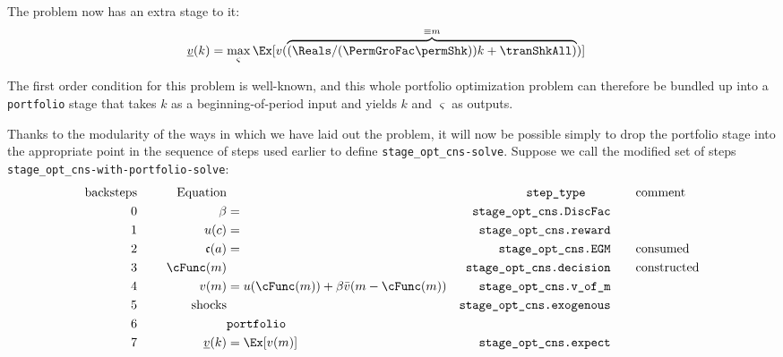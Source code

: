 \documentclass[\econtexRoot/BufferStockTheory]{subfiles}
\newcommand{\EOP}{\bar}
\newcommand{\MOP}{}
\newcommand{\BOP}{\underline}
\begin{document}
The problem now has an extra stage to it:
\begin{align*}
  \BOP{v}(k) & = \max_{\varsigma} \Ex[\MOP{v}(\overbrace{(\Reals/(\PermGroFac \permShk))k+\tranShkAll)}^{\equiv m})]
\end{align*}

The first order condition for this problem is well-known, and this whole portfolio optimization problem can therefore be bundled up into a \texttt{portfolio} stage that takes $k$ as a beginning-of-period input and yields $k$ and $\varsigma$ as outputs.

Thanks to the modularity of the ways in which we have laid out the problem, it will now be possible simply to drop the portfolio stage into the appropriate point in the sequence of steps used earlier to define \texttt{stage\_opt\_cns-solve}.
Suppose we call the modified set of steps \texttt{stage\_opt\_cns-with-portfolio-solve}:\pagebreak
\begin{alignat*}{3}
\text{backsteps} &      &   \notag \text{Equation} & \qquad                                    & \qquad \texttt{step\_type} \qquad  & \qquad \text{comment}
\\ 0             & ~~~~ & \beta                    & =                                         & \texttt{stage\_opt\_cns.DiscFac}   & %
\\ 1             & ~~~~ &   u(c)                   & =                                         & \texttt{stage\_opt\_cns.reward}    & 
\\ 2             & ~~~~ &   \mathfrak{c}(a)        & =                                         & \texttt{stage\_opt\_cns.EGM}       & \qquad \text{consumed}
\\ 3             & ~~~~ &   \cFunc(m)              &                                           & \texttt{stage\_opt\_cns.decision}  & \qquad \text{constructed} %
\\ 4             & ~~~~ & \MOP{v}(m)               & = u(\cFunc(m))+\beta \EOP{v}(m-\cFunc(m)) & \texttt{stage\_opt\_cns.v\_of\_m}  &
\\ 5             & ~~~~ & \text{shocks}            &                                           & \texttt{stage\_opt\_cns.exogenous} & %
\\ 6             & ~~~~ &                          & \texttt{portfolio}                        &
\\ 7             & ~~~~ & \BOP{v}(k)               & = \Ex[\MOP{v}(m)]                         & \texttt{stage\_opt\_cns.expect}    & %
\end{alignat*}
\end{document}
